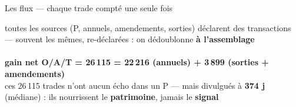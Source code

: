 \documentclass[11pt,aspectratio=169]{beamer}
\newcommand{\badgel}[2]{\colorbox{#1}{\textcolor{black!80}{\footnotesize\textbf{#2}}}}
\newcommand{\colR}{}
\begin{document}
\begin{frame}{Les flux — chaque trade compté une seule fois}
  \colR
  \centering
  {\footnotesize toutes les sources (P, annuels, amendements, sorties) déclarent des transactions —
   souvent les mêmes, re-déclarées : on dédoublonne \textbf{à l'assemblage}}\\[3mm]
  \\[4mm]
  {\footnotesize \badgel{dataC!18}{\textcolor{dataC}{\textbf{gain net O/A/T = 26\,115}}
   = 22\,216 (annuels) + 3\,899 (sorties + amendements)}}\\[1.5mm]
  {\scriptsize\color{black!60} ces 26\,115 trades n'ont aucun écho dans un P — mais divulgués à
   \textbf{374 j} (médiane) : ils nourrissent le \textbf{patrimoine}, jamais le \textbf{signal}}
\end{frame}
\end{document}
